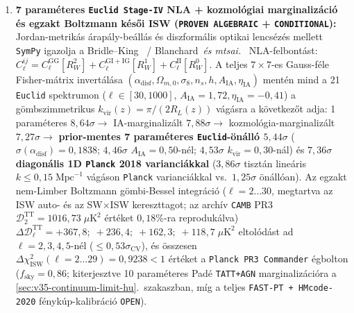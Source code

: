 \documentclass[11pt,a4paper]{article}
\begin{document}
{\begin{enumerate}
\item \textbf{7 paraméteres \texttt{Euclid Stage-IV} NLA + kozmológiai marginalizáció és egzakt Boltzmann késői ISW (\texttt{PROVEN ALGEBRAIC} + \texttt{CONDITIONAL}):} Jordan-metrikás árapály-beállás és diszformális optikai lencsézés mellett \texttt{SymPy} igazolja a Bridle--King~\cite{BridleKing2007} / Blanchard~\textit{és mtsai.}~\cite{Blanchard2020} NLA-felbontást: $C_\ell^{ij} = C_\ell^{\mathrm{GG}}[R_W^2] + C_\ell^{\mathrm{GI+IG}}[R_W^1] + C_\ell^{\mathrm{II}}[R_W^0]$. A teljes $7\times 7$-es Gauss-féle Fisher-mátrix invertálása $(\alpha_{\mathrm{disf}},\Omega_{m,0},\sigma_8,n_s,h,A_{\mathrm{IA}},\eta_{\mathrm{IA}})$ mentén mind a 21 \texttt{Euclid} spektrumon ($\ell\in[30,1000]$, $A_{\mathrm{IA}}=1{,}72, \eta_{\mathrm{IA}}=-0{,}41$) a gömbszimmetrikus $k_{\mathrm{vir}}(z)=\pi/(2R_L(z))$ vágásra a következőt adja: 1 paraméteres $8{,}64\sigma \to$ IA-marginalizált $7{,}88\sigma \to$ kozmológia-marginalizált $7{,}27\sigma \to$ \textbf{prior-mentes 7 paraméteres \texttt{Euclid}-önálló $5{,}44\sigma$} ($\sigma(\alpha_{\mathrm{disf}})=0{,}1838$; $4{,}46\sigma$ $A_{\mathrm{IA}}=0{,}50$-nél; $4{,}53\sigma$ $k_{\mathrm{vir}}=0{,}30$-nál) és \textbf{$7{,}36\sigma$ diagonális 1D \texttt{Planck} 2018 varianciákkal} ($3{,}86\sigma$ tisztán lineáris $k\le 0{,}15\;\mathrm{Mpc}^{-1}$ vágáson \texttt{Planck} varianciákkal vs.\ $1{,}25\sigma$ önállóan). Az egzakt nem-Limber Boltzmann gömbi-Bessel integráció ($\ell=2\dots 30$, megtartva az ISW auto- és az SW$\times$ISW kereszttagot; az archív \texttt{CAMB} PR3 $\mathcal{D}_2^{\mathrm{TT}}=1016{,}73\;\mu\mathrm{K}^2$ értéket $0{,}18\%$-ra reprodukálva) $\Delta\mathcal{D}_\ell^{\mathrm{TT}} = +367{,}8;\; +236{,}4;\; +162{,}3;\; +118{,}7\;\mu\mathrm{K}^2$ eltolódást ad $\ell=2,3,4,5$-nél ($\le 0{,}53\sigma_{\mathrm{CV}}$), és összesen \textbf{$\Delta\chi^2_{\mathrm{ISW}}(\ell=2\dots 29) = 0{,}9238 < 1$} értéket a \texttt{Planck PR3 Commander} égbolton ($f_{\mathrm{sky}}=0{,}86$; kiterjesztve 10 paraméteres Pad\'e \texttt{TATT+AGN} marginalizációra a \ref{sec:v35-continuum-limit-hu}.~szakaszban, míg a teljes \texttt{FAST-PT + HMcode-2020} fénykúp-kalibráció \texttt{OPEN}).
\end{enumerate}\par}
\end{document}

